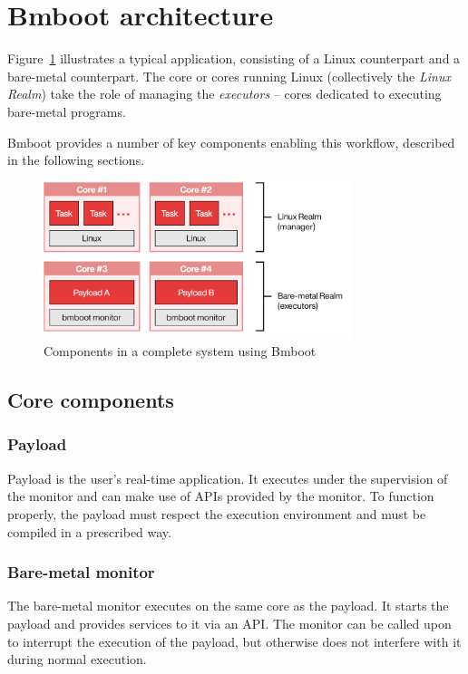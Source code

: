 \section{Bmboot architecture}

Figure~\ref{fig:components} illustrates a typical application, consisting of a Linux counterpart and a bare-metal counterpart. The core or cores running Linux (collectively the \textit{Linux Realm}) take the role of managing the \textit{executors} -- cores dedicated to executing bare-metal programs.

Bmboot provides a number of key components enabling this workflow, described in the following sections.

\begin{figure}[h]
  \centering
  \includegraphics[width=0.8\textwidth]{images/realms-simplified.png}
  \caption{Components in a complete system using Bmboot \label{fig:components}}
\end{figure}

\subsection{Core components}

\subsubsection{Payload}

Payload is the user's real-time application. It executes under the supervision of the monitor and can make use of APIs provided by the monitor. To function properly, the payload must respect the execution environment and must be compiled in a prescribed way.

\subsubsection{Bare-metal monitor}

The bare-metal monitor executes on the same core as the payload. It starts the payload and provides services to it via an API. The monitor can be called upon to interrupt the execution of the payload, but otherwise does not interfere with it during normal execution.

